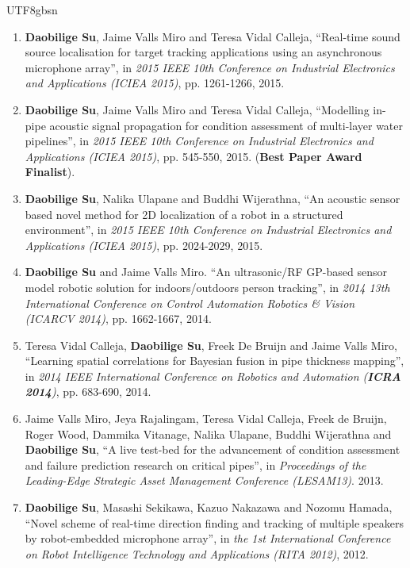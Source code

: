 \documentclass[margin,line]{res}
\begin{document}
\begin{CJK*}{UTF8}{gbsn}
\begin{resume}
\begin{enumerate}
\item {\bf Daobilige Su}, Jaime Valls Miro and Teresa Vidal Calleja, ``Real-time sound source localisation for target tracking applications using an asynchronous microphone array'', in {\it 2015 IEEE 10th Conference on Industrial Electronics and Applications (ICIEA 2015)}, pp. 1261-1266, 2015.

\item {\bf Daobilige Su}, Jaime Valls Miro and Teresa Vidal Calleja, ``Modelling in-pipe acoustic signal propagation for condition assessment of multi-layer water pipelines'', in {\it 2015 IEEE 10th Conference on Industrial Electronics and Applications (ICIEA 2015)}, pp. 545-550, 2015. ({\bf Best Paper Award Finalist}).

\item {\bf Daobilige Su}, Nalika Ulapane and Buddhi Wijerathna, ``An acoustic sensor based novel method for 2D localization of a robot in a structured environment'', in {\it 2015 IEEE 10th Conference on Industrial Electronics and Applications (ICIEA 2015)}, pp. 2024-2029, 2015.

\item {\bf Daobilige Su} and Jaime Valls Miro. ``An ultrasonic/RF GP-based sensor model robotic solution for indoors/outdoors person tracking'', in {\it 2014 13th International Conference on Control Automation Robotics \& Vision (ICARCV 2014)}, pp. 1662-1667, 2014.

\item Teresa Vidal Calleja, {\bf Daobilige Su}, Freek De Bruijn and Jaime Valls Miro, ``Learning spatial correlations for Bayesian fusion in pipe thickness mapping'', in {\it 2014 IEEE International Conference on Robotics and Automation (\textbf{ICRA 2014})}, pp. 683-690, 2014.

\item Jaime Valls Miro, Jeya Rajalingam, Teresa Vidal Calleja, Freek de Bruijn, Roger Wood, Dammika Vitanage, Nalika Ulapane, Buddhi Wijerathna and {\bf Daobilige Su}, ``A live test-bed for the advancement of condition assessment and failure prediction research on critical pipes'', in {\it Proceedings of the Leading-Edge Strategic Asset Management Conference (LESAM13)}. 2013.

\item {\bf Daobilige Su}, Masashi Sekikawa, Kazuo Nakazawa and Nozomu Hamada, ``Novel scheme of real-time direction finding and tracking of multiple speakers by robot-embedded microphone array'', in {\it the 1st International Conference on Robot Intelligence Technology and Applications (RITA 2012)}, 2012.


\end{enumerate}
\end{resume}
\end{CJK*}
\end{document}

